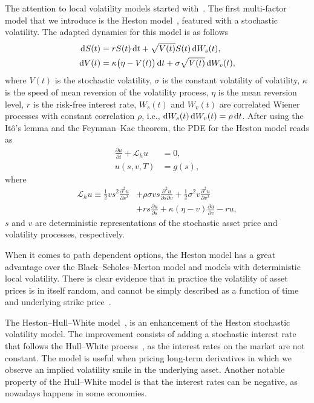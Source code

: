 \documentclass{UUThesisTemplate}
\begin{document}
\par
The attention to local volatility models started with~\cite{dupire1994pricing}. The first multi-factor model that we introduce is the Heston model~\cite{heston1993closed}, featured with a stochastic volatility. The adapted dynamics for this model is as follows
\begin{align}
\dif S(t) & =  rS(t)\dif t + \sqrt{V(t)} S(t) \dif W_s(t), \label{qlsvSDE1} \\
\dif V(t) & =  \kappa\big(\eta-V(t)\big)\dif t + \sigma \sqrt{V(t)}\dif W_v(t), \label{qlsvSDE2}
\end{align}
where $V(t)$ is the stochastic volatility, $\sigma$ is the constant volatility of volatility, $\kappa$ is the speed of mean reversion of the volatility process, $\eta$ is the mean reversion level, $r$ is the risk-free interest rate, $W_s(t)$ and $W_v(t)$ are correlated Wiener processes with constant correlation $\rho$, i.e., $\dif W_s(t) \dif W_v(t) = \rho \dif t$. After using the It\^{o}'s lemma and the Feynman--Kac theorem, the PDE for the Heston model reads as
\begin{align}
\frac{\partial u}{\partial t}+\mathcal{L}_h u&=0, \nonumber \\
u(s,v,T) &= g(s), \label{hstPDE}
\end{align}
where
\begin{align}
\mathcal{L}_{h} u \equiv \frac{1}{2}vs^2\frac{\partial^2 u}{\partial s^2} &+ \rho\sigma v s \frac{\partial^2 u}{\partial s\partial v} + \frac{1}{2}\sigma^2v\frac{\partial^2 u}{\partial v^2} \nonumber \\ 
               &+ rs\frac{\partial u}{\partial s} + \kappa(\eta-v)\frac{\partial u}{\partial v} - ru, \label{eqHSTop}
\end{align}
$s$ and $v$ are deterministic representations of the stochastic asset price and volatility processes, respectively.
\par
When it comes to path dependent options, the Heston model has a great advantage over the Black--Scholes--Merton model and models with deterministic local volatility. There is clear evidence that in practice the volatility of asset prices is in itself random, and cannot be simply described as a function of time and underlying strike price~\cite{cont2001empirical}. 

\par
The Heston--Hull--White model~\cite{grzelak2011heston, grzelak2012extension}, is an enhancement of the Heston stochastic volatility model. The improvement consists of adding a stochastic interest rate that follows the Hull--White process~\cite{hull1990pricing}, as the interest rates on the market are not constant. The model is useful when pricing long-term derivatives in which we observe an implied volatility smile in the underlying asset. Another notable property of the Hull--White model is that the interest rates can be negative, as nowadays happens in some economies. 
\end{document}

